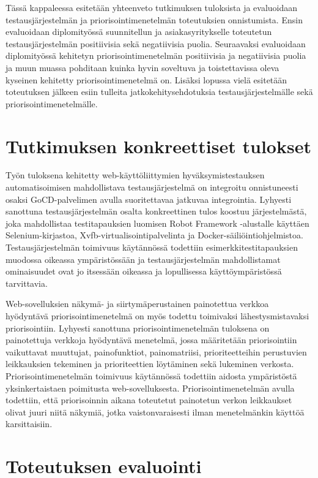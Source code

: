 Tässä kappaleessa esitetään yhteenveto tutkimuksen tuloksista ja evaluoidaan testausjärjestelmän ja priorisointimenetelmän toteutuksien onnistumista.
Ensin evaluoidaan diplomityössä suunnitellun ja asiakasyritykselle toteutetun testausjärjestelmän positiivisia sekä negatiivisia puolia.
Seuraavaksi evaluoidaan diplomityössä kehitetyn priorisointimenetelmän positiivisia ja negatiivisia puolia ja muun muassa pohditaan kuinka hyvin soveltuva ja toistettavissa oleva kyseinen kehitetty priorisointimenetelmä on.
Lisäksi lopussa vielä esitetään toteutuksen jälkeen esiin tulleita jatkokehitysehdotuksia testausjärjestelmälle sekä priorisointimenetelmälle.

\section{Tutkimuksen konkreettiset tulokset} \label{ch:12_tutkimuksen_konkreettiset_tulokset}

  Työn tuloksena kehitetty  web-käyttöliittymien hyväksymistestauksen automatisoimisen mahdollistava testausjärjestelmä on integroitu onnistuneesti osaksi GoCD-palvelimen avulla suoritettavaa jatkuvaa integrointia.
  Lyhyesti sanottuna testausjärjestelmän osalta konkreettinen tulos koostuu järjestelmästä, joka mahdollistaa testitapauksien luomisen Robot Framework -alustalle käyttäen Selenium-kirjastoa, Xvfb-virtualisointipalvelinta ja Docker-säiliöintiohjelmistoa.
  Testausjärjestelmän toimivuus käytännössä todettiin esimerkkitestitapauksien muodossa oikeassa ympäristössään ja testausjärjestelmän mahdollistamat ominaisuudet ovat jo itsessään oikeassa ja lopullisessa käyttöympäristössä tarvittavia.

  Web-sovelluksien näkymä- ja siirtymäperustainen painotettua verkkoa hyödyntävä priorisointimenetelmä on myös todettu toimivaksi lähestysmistavaksi priorisointiin.
  Lyhyesti sanottuna priorisointimenetelmän tuloksena on painotettuja verkkoja hyödyntävä menetelmä, jossa määritetään priorisointiin vaikuttavat muuttujat, painofunktiot, painomatriisi, prioriteetteihin perustuvien leikkauksien tekeminen ja prioriteettien löytäminen sekä lukeminen verkosta.
  Priorisointimenetelmän toimivuus käytännössä todettiin aidosta ympäristöstä yksinkertaistaen poimitusta web-sovelluksesta.
  Priorisointimenetelmän avulla todettiin, että priorisoinnin aikana toteutetut painotetun verkon leikkaukset olivat juuri niitä näkymiä, jotka vaistonvaraisesti ilman menetelmänkin käyttöä karsittaisiin.

\section{Toteutuksen evaluointi} \label{ch:12_toteutuksen_evaluointi}

